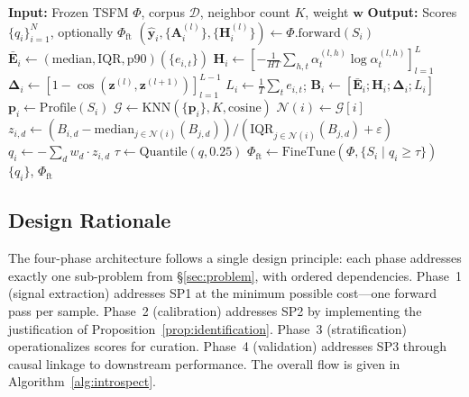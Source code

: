 \documentclass{article}
\begin{document}
\begin{algorithm}[t]
\caption{IntroAct-TS}
\label{alg:introspect}
\begin{algorithmic}[1]
\State \textbf{Input:} Frozen TSFM $\Phi$, corpus $\mathcal{D}$, neighbor count $K$, weight $\mathbf{w}$
\State \textbf{Output:} Scores $\{q_i\}_{i=1}^{N}$, optionally $\Phi_{\text{ft}}$
\State
{} 
    \State $(\hat{\mathbf{y}}_i, \{\mathbf{A}_i^{(l)}\}, \{\mathbf{H}_i^{(l)}\}) \gets \Phi.\text{forward}(S_i)$
    \State $\bar{\mathbf{E}}_i \gets (\text{median}, \text{IQR}, \text{p90})(\{e_{i,t}\})$
    \State $\mathbf{H}_i \gets [-\frac{1}{HT}\sum_{h,t} \alpha_t^{(l,h)}\log \alpha_t^{(l,h)}]_{l=1}^{L}$
    \State $\boldsymbol{\Delta}_i \gets [1 - \cos(\mathbf{z}^{(l)}, \mathbf{z}^{(l+1)})]_{l=1}^{L-1}$
    \State $L_i \gets \frac{1}{T}\sum_t e_{i,t}$; $\mathbf{B}_i \gets [\bar{\mathbf{E}}_i; \mathbf{H}_i; \boldsymbol{\Delta}_i; L_i]$
    \State $\mathbf{p}_i \gets \text{Profile}(S_i)$ 
\EndFor
\State
\State $\mathcal{G} \gets \text{KNN}(\{\mathbf{p}_i\}, K, \text{cosine})$ 
    \State $\mathcal{N}(i) \gets \mathcal{G}[i]$
        \State $z_{i,d} \gets (B_{i,d} - \text{median}_{j\in\mathcal{N}(i)}(B_{j,d})) / (\text{IQR}_{j\in\mathcal{N}(i)}(B_{j,d}) + \varepsilon)$
    \EndFor
    \State $q_i \gets -\sum_d w_d \cdot z_{i,d}$
\EndFor
\State
\State $\tau \gets \text{Quantile}(q, 0.25)$ 
\State $\Phi_{\text{ft}} \gets \text{FineTune}(\Phi, \{S_i \mid q_i \geq \tau\})$
\State \Return $\{q_i\}$, $\Phi_{\text{ft}}$
\end{algorithmic}
\end{algorithm}

\subsection{Design Rationale}

The four-phase architecture follows a single design principle: each phase addresses exactly one sub-problem from \S\ref{sec:problem}, with ordered dependencies. Phase~1 (signal extraction) addresses SP1 at the minimum possible cost---one forward pass per sample. Phase~2 (calibration) addresses SP2 by implementing the justification of Proposition~\ref{prop:identification}. Phase~3 (stratification) operationalizes scores for curation. Phase~4 (validation) addresses SP3 through causal linkage to downstream performance. The overall flow is given in Algorithm~\ref{alg:introspect}.
\end{document}
